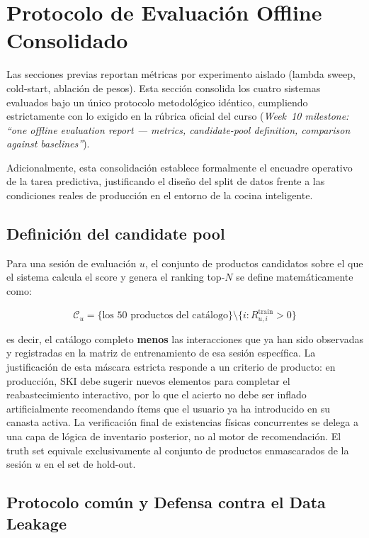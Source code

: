 \documentclass[12pt,a4paper]{article}
\begin{document}
\section{Protocolo de Evaluación Offline Consolidado}
\label{sec:offline}

Las secciones previas reportan métricas por experimento aislado (lambda sweep, cold-start, ablación de pesos). Esta sección consolida los cuatro sistemas evaluados bajo un único protocolo metodológico idéntico, cumpliendo estrictamente con lo exigido en la rúbrica oficial del curso (\textit{Week~10 milestone: ``one offline evaluation report — metrics, candidate-pool definition, comparison against baselines''}). 

Adicionalmente, esta consolidación establece formalmente el encuadre operativo de la tarea predictiva, justificando el diseño del split de datos frente a las condiciones reales de producción en el entorno de la cocina inteligente.

\subsection{Definición del candidate pool}
\label{sec:candidate-pool}

Para una sesión de evaluación $u$, el conjunto de productos candidatos sobre el que el sistema calcula el score y genera el ranking top-$N$ se define matemáticamente como:

\[
\mathcal{C}_u = \{\text{los 50 productos del catálogo}\} \setminus \{i : R^{\text{train}}_{u,i} > 0\}
\]

es decir, el catálogo completo \textbf{menos} las interacciones que ya han sido observadas y registradas en la matriz de entrenamiento de esa sesión específica. La justificación de esta máscara estricta responde a un criterio de producto: en producción, SKI debe sugerir nuevos elementos para completar el reabastecimiento interactivo, por lo que el acierto no debe ser inflado artificialmente recomendando ítems que el usuario ya ha introducido en su canasta activa. La verificación final de existencias físicas concurrentes se delega a una capa de lógica de inventario posterior, no al motor de recomendación. El truth set equivale exclusivamente al conjunto de productos enmascarados de la sesión $u$ en el set de hold-out.

\subsection{Protocolo común y Defensa contra el Data Leakage}
\end{document}
